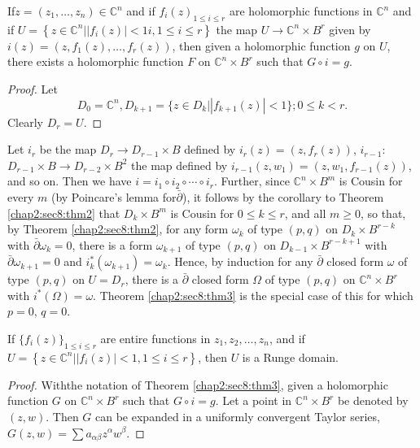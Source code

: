 \begin{theorem}[Oka]\label{chap2:sec8:thm3}%
  If\pageoriginale $z = (z_1, \ldots , z_n) \in \mathbb{C}^n$ and if $f_i(z)_{1 \leq
    i \leq r}$ are holomorphic functions in $\mathbb{C}^n$ and if $U =
  \left\{z \in \mathbb{C}^n \Big| |f_i (z)|<1 i, 1\leq i \leq r
  \right\}$ the map $U 
  \rightarrow \mathbb{C}^n \times B^r$ given by $i(z) = (z, f_1(z),
  \ldots , f_r (z))$, then  given a holomorphic function $g$ on $U$,
  there exists a holomorphic function $F$ on $\mathbb{C}^n \times B^r$
  such that $G \circ i = g$. 
\end{theorem} 

\begin{proof}
  Let
  $$
  D_0 = \mathbb{C}^n , D_{k+1} = \{z \in D_k \bigg| |f_{k+1}(z)| < 1
  \}; 0 \leq k < r. 
  $$
  Clearly $D_r = U$.
\end{proof} 
 
Let $i_r$ be the map $D_r \rightarrow D_{r-1} \times B$ defined by
$i_r (z) = (z, f_r(z))$, $i_{r-1}$: $D_{r-1} \times B \rightarrow
D_{r-2} \times B^2$ the map defined by $i_{r-1} (z, w_1) = (z, w_1,
f_{r-1} (z))$, and so on. Then we have $i = i_1 \circ i_2 \circ \cdots \circ
i_r$. Further, since $\mathbb{C}^n \times B^m$ is Cousin for every $m$
(by Poincare's lemma for$\bar{\partial}$), it follows by the corollary
to Theorem \ref{chap2:sec8:thm2} that $D_k \times B^m$ is Cousin for $0 \leq k \leq r$,
and all $m \geq 0$, so that, by Theorem \ref{chap2:sec8:thm2}, for any form $\omega_k$
of type $(p,q)$ on $D_k \times B^{r-k}$ with $\bar{\partial} \omega_k
= 0$, there is a form $\omega_{k+1}$ of type $(p,q)$ on $D_{k-1}
\times B^{r- k+1}$ with $\bar{\partial} \omega_{k+1} = 0$ and $i^*_k
(\omega_{k+1}) = \omega_{k}$. Hence, by induction for any
$\bar{\partial}$ closed form $\omega$ of type $(p,q)$ on $U = D_r$,
there is a $\bar{\partial}$ closed form $\Omega$ of type $(p,q)$ on
$\mathbb{C}^n \times B^r$ with $i^* (\Omega) =
\omega$. Theorem \ref{chap2:sec8:thm3} is
the special case of this for which $p = 0$, $q = 0$. 

\begin{theorem}\label{chap2:sec8:thm4}%
  If $\{f_i (z) \}_{1 \leq i \leq r}$ are entire functions in $z_1,
  z_2, \ldots, z_n$, and if $U = \left\{ z \in \mathbb{C}^n \bigg| |f_i
  (z)| < 1,1 \leq i \leq r \right\}$, then $U$ is a Runge domain. 
\end{theorem}  

\begin{proof}
  With\pageoriginale the notation of Theorem \ref{chap2:sec8:thm3},
  given a holomorphic function $G$ 
  on $\mathbb{C}^n \times B^r$ such that $G \circ i = g$. Let a point in
  $\mathbb{C}^n \times B^r$ be denoted by $(z, w)$. Then $G$ can be
  expanded in a uniformly convergent Taylor series, $G(z, w) = \sum
  a_{\alpha \beta} z^\alpha w^\beta$. 
\end{proof} 

